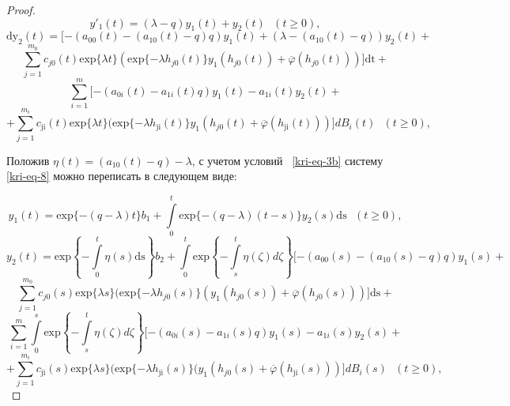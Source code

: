 \begin{proof}
\begin{equation*}
	y'_{1}(t)=(\lambda -q)y_1(t)+y_2(t)\text{   }(t\ge 0),
\end{equation*}
\begin{equation*}	
	\text{dy}_2(t)=[-(a_{00}(t)-(a_{10}(t)-q)q)y_1(t)+(\lambda -(a_{10}(t)-q))y_2(t)+
\end{equation*}
\begin{equation}\label{kri-eq-8}	
	\overset{m_0}{\underset{j=1}{\sum }}c_{\mathit{j0}}(t)\text{exp}\{\mathit{\lambda t}\}(\text{exp}\{-\mathit{\lambda
		h}_{\mathit{j0}}(t)\}y_1(h_{\mathit{j0}}(t))+\overline{\varphi
	}(h_{\mathit{j0}}(t)))]\text{dt}+
\end{equation}
\begin{equation*}
	\overset m{\underset{i=1}{\sum
	}}[-(a_{0i}(t)-a_{1i}(t)q)y_1(t)-a_{1i}(t)y_2(t)+
\end{equation*}
\begin{equation*}
	+\overset{m_i}{\underset{j=1}{\sum
	}}c_{\text{ji}}(t)\text{exp}\{\mathit{\lambda t}\}(\text{exp}\{-\mathit{\lambda
		h}_{\text{ji}}(t)\}y_1(h_{\mathit{j0}}(t)+\overline{\varphi
	}(h_{\text{ji}}(t)))]\mathit{dB}_i(t)\text{  }(t\ge 0),
\end{equation*}

Положив  $\eta (t)=(a_{10}(t)-q)-\lambda $, с учетом условий \ \eqref{kri-eq-3b} систему \eqref{kri-eq-8} можно переписать в следующем виде:

\begin{equation*}
	y_1(t)=\text{exp}\{-(q-\lambda )t\}b_1+\int\limits_{0}^{t}\text{exp}\{-(q-\lambda
	)(t-s)\}y_2(s)\text{ds}\text{   }(t\ge 0),
\end{equation*}
\begin{equation*}		
	y_2(t)=\text{exp}\left\{-\int\limits_{0}^{t}\eta (s)\text{ds}\right\}b_2+\int\limits_{0}^{t}\text{exp}\left\{-\int\limits_{s}^{t}\eta (\zeta )\mathit{d\zeta
	}\right\}[-(a_{00}(s)-(a_{10}(s)-q)q)y_1(s)+
\end{equation*}	
\begin{equation}\label{kri-eq-9}
	\overset{m_0}{\underset{j=1}{\sum
	}}c_{\mathit{j0}}(s)\text{exp}\{\mathit{\lambda s}\}(\text{exp}\{-\mathit{\lambda
		h}_{\mathit{j0}}(s)\}(y_1(h_{\mathit{j0}}(s))+\overline{\varphi
	}(h_{\mathit{j0}}(s)))]\text{ds}+
\end{equation}	
\begin{equation*}
	\overset m{\underset{i=1}{\sum }}\int\limits_{0}^{s} \text{exp}\left\{-\int\limits_{s}^{t}\eta (\zeta )\mathit{d\zeta
	}\right\}[-(a_{0i}(s)-a_{1i}(s)q)y_1(s)-a_{1i}(s)y_2(s)+
\end{equation*}	
\begin{equation*}
	+\overset{m_i}{\underset{j=1}{\sum
	}}c_{\text{ji}}(s)\text{exp}\{\mathit{\lambda s}\}(\text{exp}\{-\mathit{\lambda
		h}_{\text{ji}}(s)\}(y_1(h_{\mathit{j0}}(s)+\overline{\varphi
	}(h_{\text{ji}}(s)))]\mathit{dB}_i(s)\text{  }(t\ge 0),
\end{equation*}


\end{proof}
